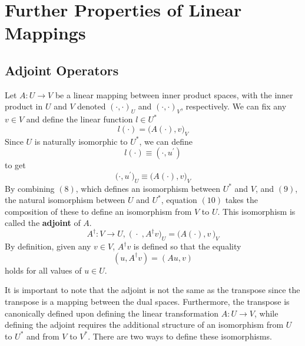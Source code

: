 \section{Further Properties of Linear Mappings}

\subsection{Adjoint Operators}

  \begin{definition}
  Let $A: U \longrightarrow V$ be a linear mapping between inner product spaces, with the inner product in $U$ and $V$ denoted $(\cdot,\cdot)_U$ and $(\cdot,\cdot)_V$, respectively. We can fix any $v \in V$ and define the linear function $l \in U^*$
  \begin{equation}
      l(\cdot) = \big(A(\cdot), v\big)_V
  \end{equation}
  Since $U$ is naturally isomorphic to $U^*$, we can define
  \begin{equation}
      l(\cdot) \equiv (\cdot, u^\prime)
  \end{equation} 
  to get 
  \begin{equation}
      \big(\cdot, u^\prime \big)_U \equiv \big(A(\cdot), v \big)_V
  \end{equation}
  By combining $(8)$, which defines an isomorphism between $U^*$ and $V$, and $(9)$, the natural isomorphism between $U$ and $U^*$, equation $(10)$ takes the composition of these to define an isomorphism from $V$ to $U$. This isomorphism is called the \textbf{adjoint} of $A$. 
  \[A^\dagger: V \longrightarrow U, \;  \big(\; \cdot \;, A^\dagger v \big)_U = \big( A(\cdot), v \,\big)_V \]
  By definition, given any $v \in V$, $A^\dagger v$ is defined so that the equality
  \[(u, A^\dagger v) = (A u, v)\]
  holds for all values of $u \in U$. 
  \end{definition}

  It is important to note that the adjoint is not the same as the transpose since the transpose is a mapping between the dual spaces. Furthermore, the transpose is canonically defined upon defining the linear transformation $A: U \longrightarrow V$, while defining the adjoint requires the additional structure of an isomorphism from $U$ to $U^*$ and from $V$ to $V^*$. There are two ways to define these isomorphisms. 

